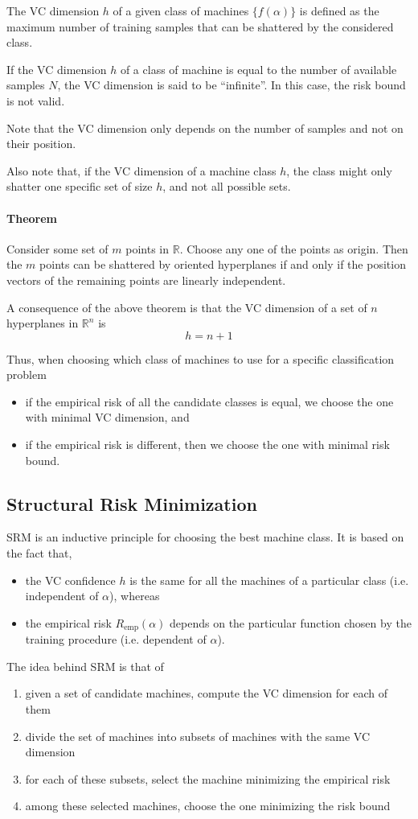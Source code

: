 \documentclass[oneside,onecolumn]{report}
\begin{document}
The VC dimension $h$ of a given class of machines $\{f(\alpha)\}$ is defined as the maximum number of training samples that can be shattered by the considered class.

If the VC dimension $h$ of a class of machine is equal to the number of available samples $N$, the VC dimension is said to be ``infinite''.
In this case, the risk bound is not valid.

Note that the VC dimension only depends on the number of samples and not on their position.

Also note that, if the VC dimension of a machine class $h$, the class might only shatter one specific set of size $h$, and not all possible sets.

\paragraph{Theorem}
Consider some set of $m$ points in $\mathbb R$.
Choose any one of the points as origin.
Then the $m$ points can be shattered by oriented hyperplanes if and only if the position vectors of the remaining points are linearly independent.

A consequence of the above theorem is that the VC dimension of a set of $n$ hyperplanes in $\mathbb R^n$ is
$$ h = n + 1 $$

Thus, when choosing which class of machines to use for a specific classification problem
\begin{itemize}
    \item if the empirical risk of all the candidate classes is equal, we choose the one with minimal VC dimension, and
    \item if the empirical risk is different, then we choose the one with minimal risk bound.
\end{itemize}

\subsection{Structural Risk Minimization}
SRM is an inductive principle for choosing the best machine class.
It is based on the fact that,
\begin{itemize}
    \item the VC confidence $h$ is the same for all the machines of a particular class (i.e. independent of $\alpha$), whereas
    \item the empirical risk $R_\text{emp}(\alpha)$ depends on the particular function chosen by the training procedure (i.e. dependent of $\alpha$).
\end{itemize}
The idea behind SRM is that of
\begin{enumerate}
    \item given a set of candidate machines, compute the VC dimension for each of them
    \item divide the set of machines into subsets of machines with the same VC dimension
    \item for each of these subsets, select the machine minimizing the empirical risk
    \item among these selected machines, choose the one minimizing the risk bound
\end{enumerate}
\end{document}
